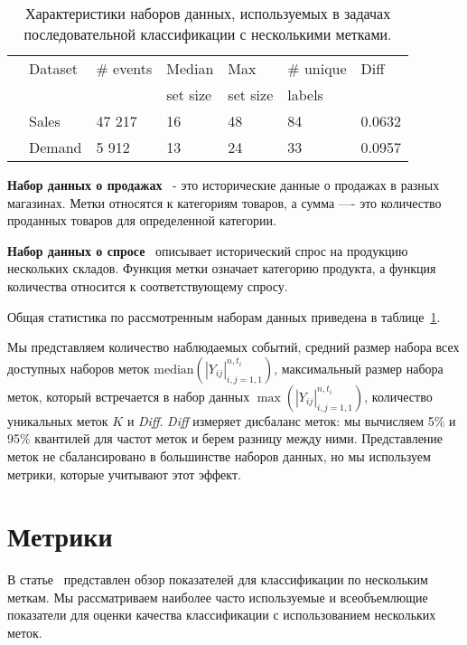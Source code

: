 \documentclass[a4paper, 12pt]{article} %
\begin{document}
\begin{table}[t!]
\centering
\begin{tabular}{p{0.3cm}p{2.2cm}p{1.7cm}p{1.6cm}p{1.6cm}p{1.8cm}p{1.1cm}}
\hline
& Dataset & \# events & Median & Max & \# unique & Diff \\
& &  & set size & set size &  labels \\
\hline
& Sales & 47 217 & 16 & 48  & 84 & 0.0632 \\
& Demand & 5 912 & 13 & 24  & 33 & 0.0957 \\
\hline
\end{tabular}
\caption{Характеристики наборов данных, используемых в задачах последовательной классификации с несколькими метками.}
\label{tab:multi_datasets}
\end{table}

\textbf{Набор данных о продажах}~\cite{sales} - это исторические данные о продажах в разных магазинах. Метки относятся к категориям товаров, а сумма ---- это количество проданных товаров для определенной категории. 

\textbf{Набор данных о спросе}~\cite{demand} описывает исторический спрос на продукцию нескольких складов. Функция метки означает категорию продукта, а функция количества относится к соответствующему спросу.

Общая статистика по рассмотренным наборам данных приведена в таблице~\ref{tab:multi_datasets}.

Мы представляем количество наблюдаемых событий, средний размер набора всех доступных наборов меток $\mathrm{median}({|Y_{ij}|}_{i, j = 1, 1}^{n, t_i})$, максимальный размер набора меток, который встречается в набор данных $\max({|Y_{ij}|}_{i, j = 1, 1}^{n, t_i})$, количество уникальных меток $K$ и \textit{Diff}. 
\textit{Diff} измеряет дисбаланс меток: мы вычисляем 5$\%$ и 95$\%$ квантилей для частот меток и берем разницу между ними.
Представление меток не сбалансировано в большинстве наборов данных, но мы используем метрики, которые учитывают этот эффект.

\section{Метрики} 

В статье~\cite{wu2017unified} представлен обзор показателей для классификации по нескольким меткам. Мы рассматриваем наиболее часто используемые и всеобъемлющие показатели для оценки качества классификации с использованием нескольких меток.
\end{document}
